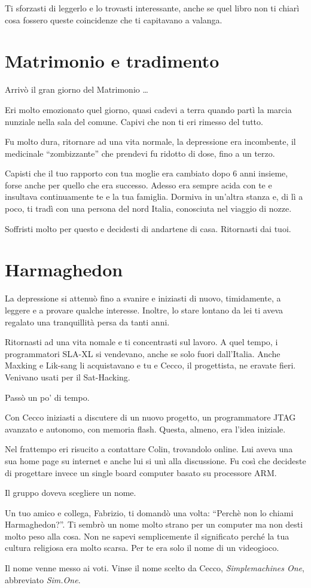 Ti sforzasti di leggerlo e lo trovasti interessante, anche se quel libro non ti chiarì cosa fossero queste coincidenze che ti capitavano a valanga.

\section{Matrimonio e tradimento}
\label{matrimonio_e_tradimento}

Arrivò il gran giorno del Matrimonio \ldots

Eri molto emozionato quel giorno, quasi cadevi a terra quando partì la marcia nunziale nella sala del comune. Capivi che non ti eri rimesso del tutto.

Fu molto dura, ritornare ad una vita normale, la depressione era incombente, il medicinale ``zombizzante'' che prendevi fu ridotto di dose, fino a un terzo.

Capisti che il tuo rapporto con tua moglie era cambiato dopo 6 anni insieme, forse anche per quello che era successo. Adesso era sempre acida con te e insultava continuamente te e la tua famiglia. Dormiva in un'altra stanza e, di lì a poco, ti tradì con una persona del nord Italia, conosciuta nel viaggio di nozze.

Soffristi molto per questo e decidesti di andartene di casa. Ritornasti dai tuoi.
 
\section{Harmaghedon}
\label{harmaghedon}
 
La depressione si attenuò fino a svanire e iniziasti di nuovo, timidamente, a leggere e a provare qualche interesse. Inoltre, lo stare lontano da lei ti aveva regalato una tranquillità persa da tanti anni.

Ritornasti ad una vita nomale e ti concentrasti sul lavoro. A quel tempo, i programmatori SLA-XL si vendevano, anche se solo fuori dall'Italia. Anche Maxking e Lik-sang li acquistavano e tu e Cecco, il progettista, ne eravate fieri. Venivano usati per il Sat-Hacking.

Passò un po' di tempo.

Con Cecco iniziasti a discutere di un nuovo progetto, un programmatore JTAG avanzato e autonomo, con memoria flash. Questa, almeno, era l'idea iniziale.

Nel frattempo eri risucito a contattare Colin, trovandolo online. Lui aveva una sua home page su internet e anche lui si unì alla discussione. Fu così che decideste di progettare invece un single board computer basato su processore ARM.

Il gruppo doveva scegliere un nome.

Un tuo amico e collega, Fabrizio, ti domandò una volta: “Perchè non lo chiami Harmaghedon?”. Ti sembrò un nome molto strano per un computer ma non desti molto peso alla cosa. Non ne sapevi semplicemente il significato perché la tua cultura religiosa era molto scarsa. Per te era solo il nome di un videogioco.

Il nome venne messo ai voti. Vinse il nome scelto da Cecco, \textit{Simplemachines One}, abbreviato \textit{Sim.One}.

